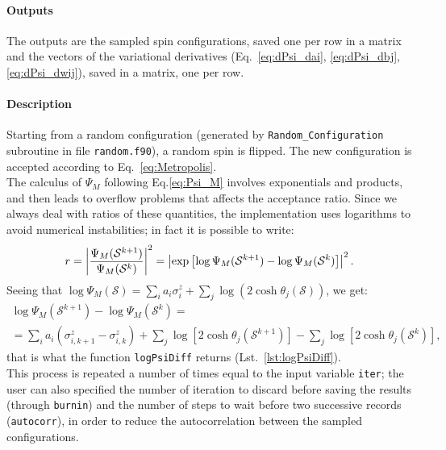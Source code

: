 \documentclass[a4paper,11pt]{article}
\begin{document}
\paragraph{Outputs}
The outputs are the sampled spin configurations, saved one per row in a matrix and the vectors of the variational derivatives (Eq.~\ref{eq:dPsi_dai}, \ref{eq:dPsi_dbj}, \ref{eq:dPsi_dwij}), saved in a matrix, one per row.

\paragraph{Description}
Starting from a random configuration (generated by \texttt{Random\_Configuration} subroutine in file \texttt{random.f90}), a random spin is flipped. The new configuration is accepted according to Eq.~\ref{eq:Metropolis}. \\
The calculus of $\Psi_M$ following Eq.\ref{eq:Psi_M} involves exponentials and products, and then leads to overflow problems that affects the acceptance ratio. Since we always deal with ratios of these quantities, the implementation uses logarithms to avoid numerical instabilities; in fact it is possible to write:
\begin{equation}
    \centering
    r = \left| \frac{\Psi_M (\mathcal{S}^{k+1})}{\Psi_M (\mathcal{S}^k)} \right|^2
      = \left| \exp \left[ \log  \Psi_M (\mathcal{S}^{k+1}) - \log \Psi_M (\mathcal{S}^k) \right]\right|^2.
\end{equation}
%
Seeing that $\log \Psi_M(\mathcal{S}) = \sum_i a_i \sigma^z_i + \sum_j \log \left( 2 \cosh \theta_j(\mathcal{S}) \right)$, we get:
\begin{multline}
    \log  \Psi_M (\mathcal{S}^{k+1}) - \log \Psi_M (\mathcal{S}^k) = \\
    = \sum_i a_i(\sigma^z_{i, k+1} - \sigma^z_{i, k}) + \sum_j \log \left[ 2 \cosh \theta_j(\mathcal{S}^{k+1}) \right] - \sum_j \log \left[ 2 \cosh \theta_j(\mathcal{S}^k) \right],
\end{multline}
%
that is what the function \texttt{logPsiDiff} returns (Lst.~\ref{lst:logPsiDiff}).\\
This process is repeated a number of times equal to the input variable \texttt{iter}; the user can also specified the number of iteration to discard before saving the results (through \texttt{burnin}) and the number of steps to wait before two successive records (\texttt{autocorr}), in order to reduce the autocorrelation between the sampled configurations.

\end{document}
